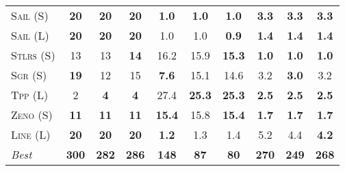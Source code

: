 \documentclass[11pt]{article}
\begin{document}
\begin{table*}[tb]
{\begin{tabular}{|l||ccc||ccc||ccc||}
\textsc{Sail} (S)&\textbf{20}&\textbf{20}&\textbf{20}&\textbf{1.0}&\textbf{1.0}&\textbf{1.0}&\textbf{3.3}&\textbf{3.3}&\textbf{3.3}\\
\textsc{Sail} (L)&\textbf{20}&\textbf{20}&\textbf{20}&1.0&1.0&\textbf{0.9}&\textbf{1.4}&\textbf{1.4}&\textbf{1.4}\\
\textsc{Stlrs} (S)&13&13&\textbf{14}&16.2&15.9&\textbf{15.3}&\textbf{1.0}&\textbf{1.0}&\textbf{1.0}\\
\textsc{Sgr} (S)&\textbf{19}&12&15&\textbf{7.6}&15.1&14.6&3.2&\textbf{3.0}&3.2\\
\textsc{Tpp} (L)&2&\textbf{4}&\textbf{4}&27.4&\textbf{25.3}&\textbf{25.3}&\textbf{2.5}&\textbf{2.5}&\textbf{2.5}\\
\textsc{Zeno} (S)&\textbf{11}&\textbf{11}&\textbf{11}&\textbf{15.4}&15.8&\textbf{15.4}&\textbf{1.7}&\textbf{1.7}&\textbf{1.7}\\
\textsc{Line} (L)&\textbf{20}&\textbf{20}&\textbf{20}&\textbf{1.2}&1.3&1.4&5.2&4.4&\textbf{4.2}
\\\hline
\textit{Best}&\textbf{300}&\textbf{282}&\textbf{286}&\textbf{148}&\textbf{87}&\textbf{80}&\textbf{270}&\textbf{249}&\textbf{268}\\\hline

        \end{tabular}}
        \caption{}
        \label{tab:all-patty}
        \end{table*}
        
\end{document}
